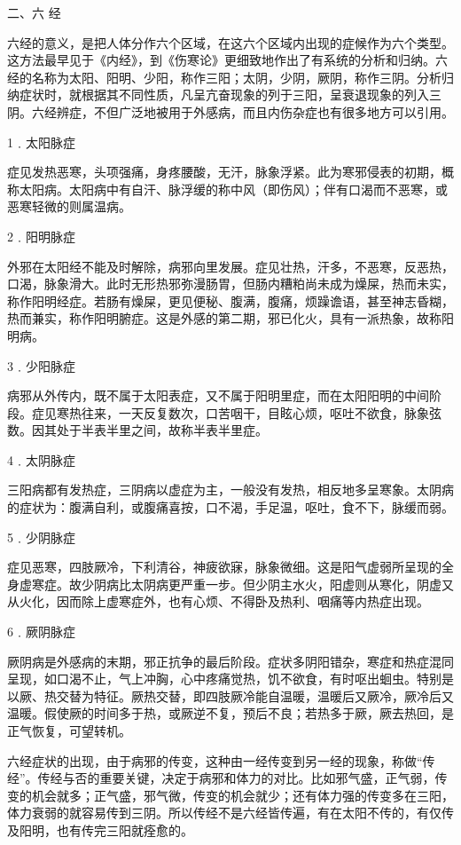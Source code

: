 \documentclass[a4paper,12pt,UTF8,twoside]{ctexbook}
\begin{document}
二、六 经

六经的意义，是把人体分作六个区域，在这六个区域内出现的症候作为六个类型。这方法最早见于《内经》，到《伤寒论》更细致地作出了有系统的分析和归纳。六经的名称为太阳、阳明、少阳，称作三阳；太阴，少阴，厥阴，称作三阴。分析归纳症状时，就根据其不同性质，凡呈亢奋现象的列于三阳，呈衰退现象的列入三阴。六经辨症，不但广泛地被用于外感病，而且内伤杂症也有很多地方可以引用。

1﹒太阳脉症

症见发热恶寒，头项强痛，身疼腰酸，无汗，脉象浮紧。此为寒邪侵表的初期，概称太阳病。太阳病中有自汗、脉浮缓的称中风（即伤风）；伴有口渴而不恶寒，或恶寒轻微的则属温病。

2﹒阳明脉症

外邪在太阳经不能及时解除，病邪向里发展。症见壮热，汗多，不恶寒，反恶热，口渴，脉象滑大。此时无形热邪弥漫肠胃，但肠内糟粕尚未成为燥屎，热而未实，称作阳明经症。若肠有燥屎，更见便秘、腹满，腹痛，烦躁谵语，甚至神志昏糊，热而兼实，称作阳明腑症。这是外感的第二期，邪已化火，具有一派热象，故称阳明病。

3﹒少阳脉症

病邪从外传内，既不属于太阳表症，又不属于阳明里症，而在太阳阳明的中间阶段。症见寒热往来，一天反复数次，口苦咽干，目眩心烦，呕吐不欲食，脉象弦数。因其处于半表半里之间，故称半表半里症。

4﹒太阴脉症

三阳病都有发热症，三阴病以虚症为主，一般没有发热，相反地多呈寒象。太阴病的症状为：腹满自利，或腹痛喜按，口不渴，手足温，呕吐，食不下，脉缓而弱。

5﹒少阴脉症

症见恶寒，四肢厥冷，下利清谷，神疲欲寐，脉象微细。这是阳气虚弱所呈现的全身虚寒症。故少阴病比太阴病更严重一步。但少阴主水火，阳虚则从寒化，阴虚又从火化，因而除上虚寒症外，也有心烦、不得卧及热利、咽痛等内热症出现。

6﹒厥阴脉症

厥阴病是外感病的末期，邪正抗争的最后阶段。症状多阴阳错杂，寒症和热症混同呈现，如口渴不止，气上冲胸，心中疼痛觉热，饥不欲食，有时呕出蛔虫。特别是以厥、热交替为特征。厥热交替，即四肢厥冷能自温暖，温暖后又厥冷，厥冷后又温暖。假使厥的时间多于热，或厥逆不复，预后不良；若热多于厥，厥去热回，是正气恢复，可望转机。

六经症状的出现，由于病邪的传变，这种由一经传变到另一经的现象，称做“传经”。传经与否的重要关键，决定于病邪和体力的对比。比如邪气盛，正气弱，传变的机会就多；正气盛，邪气微，传变的机会就少；还有体力强的传变多在三阳，体力衰弱的就容易传到三阴。所以传经不是六经皆传遍，有在太阳不传的，有仅传及阳明，也有传完三阳就痊愈的。
\end{document}
